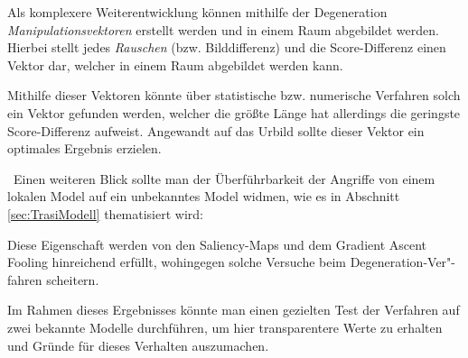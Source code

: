 Als komplexere Weiterentwicklung können mithilfe der Degeneration \textit{Manipulationsvektoren} erstellt werden und in einem Raum abgebildet werden. Hierbei stellt jedes \textit{Rauschen} (bzw. Bilddifferenz) und die Score-Differenz einen Vektor dar, welcher in einem Raum abgebildet werden kann.   

Mithilfe dieser Vektoren könnte über statistische bzw. numerische Verfahren solch ein Vektor gefunden werden, welcher die größte Länge hat allerdings die geringste Score-Differenz aufweist. Angewandt auf das Urbild sollte dieser Vektor ein optimales Ergebnis erzielen.  

~\newline Einen weiteren Blick sollte man der Überführbarkeit der Angriffe von einem lokalen Model auf ein unbekanntes Model widmen, wie es in Abschnitt \ref{sec:TrasiModell} thematisiert wird: 

Diese Eigenschaft werden von den Saliency-Maps und dem Gradient Ascent Fooling hinreichend erfüllt, wohingegen solche Versuche beim Degeneration-Ver"-fahren scheitern. 

Im Rahmen dieses Ergebnisses könnte man einen gezielten Test der Verfahren auf zwei bekannte Modelle durchführen, um hier transparentere Werte zu erhalten und Gründe für dieses Verhalten auszumachen. 
